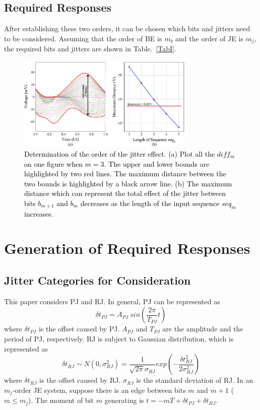\documentclass[conference]{IEEEtran}
\begin{document}
\subsection{Required Responses}\label{IIIC}

\color{black}
After establishing these two orders, it can be chosen which bits and jitters need to be considered.
\color{black}
Assuming that the order of BE is $m_b$ and the order of JE is $m_j$, the required bits and jitters are shown in Table.~\ref{TabI}.

\begin{figure}[t]
\centerline{\includegraphics[width=240pt]{Fig6-7.png}}
\caption{\textcolor{black}{Determination of the order of the jitter effect. (a) Plot all the $diff_m$ on one figure when $m=3$. The upper and lower bounds are highlighted by two red lines. The maximum distance between the two bounds is highlighted by a black arrow line. (b) The maximum distance which can represent the total effect of the jitter between bits $b_{m+1}$ and $b_m$ decreases as the length of the input sequence $seq_m$ increases.}}
\label{Fig6-7}
\end{figure}

\section{Generation of Required Responses}\label{IV}

\subsection{Jitter Categories for Consideration}\label{IVA}

\color{black}
This paper considers PJ and RJ.
\color{black}
In general, PJ can be represented as
\begin{equation}
\delta t_{PJ}=A_{PJ}\ sin(\frac{2\pi}{T_{PJ}}t)
\label{eq3}
\end{equation}
where $\delta t_{PJ}$ is the offset caused by PJ. $A_{PJ}$ and $T_{PJ}$ are the amplitude and the period of PJ, respectively. RJ is subject to Gaussian distribution, which is represented as
\begin{equation}
\delta t_{RJ}\sim N(0,\sigma_{RJ}^2)=\frac{1}{\sqrt{2\pi}\sigma_{RJ}}
exp(-\frac{\delta t_{RJ}^2}{2\sigma_{RJ}^2})
\label{eq4}
\end{equation}
where $\delta t_{RJ}$ is the offset caused by RJ. $\sigma_{RJ}$ is the standard deviation of RJ. In an $m_j$-order JE system, suppose there is an edge between bits $m$ and $m+1$ ($m\leq m_j$). The moment of bit $m$ generating is $t=-mT+\delta t_{PJ}+\delta t_{RJ}$.
\end{document}
